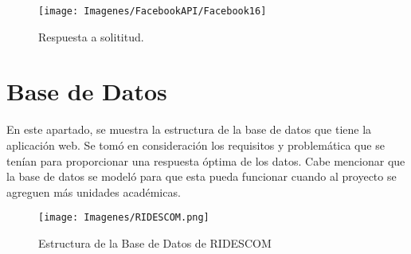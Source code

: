 	\begin{figure}[hbt!]
		\centering
		\texttt{[image: Imagenes/FacebookAPI/Facebook16]}
		\caption{Respuesta a solititud.}
		\label{creacionFB16}
	\end{figure}
	
	
	\chapter{Base de Datos}
	\noindent En este apartado, se muestra la estructura de la base de datos que tiene la aplicación web. Se tomó en consideración los requisitos y problemática que se tenían para proporcionar una respuesta óptima de los datos. Cabe mencionar que la base de datos se modeló para que esta pueda funcionar cuando al proyecto se agreguen más unidades académicas.
	
		\label{BasedeDatos}
		\begin{figure}[hbt!]
			\centering
			\texttt{[image: Imagenes/RIDESCOM.png]}
			\caption{Estructura de la Base de Datos de RIDESCOM}
			\label{BaseDatos}
		\end{figure}
		
		
	
	\pagebreak
		
